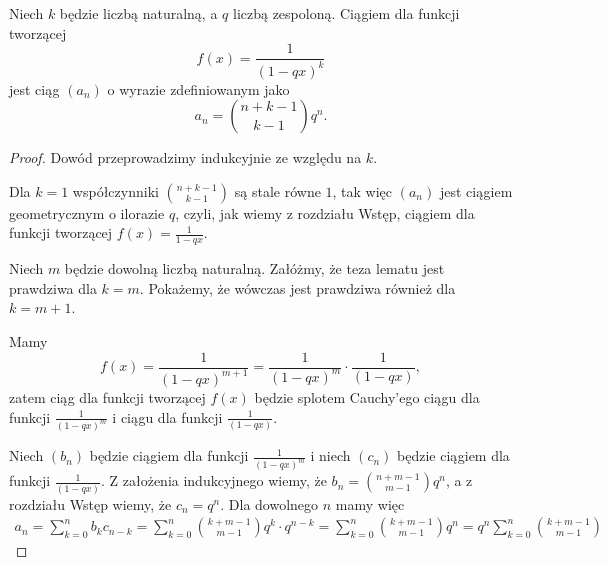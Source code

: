 \documentclass[shortabstract]{imthesis}
\begin{document}
    \begin{lemma}
    Niech $k$ będzie liczbą naturalną, a $q$ liczbą zespoloną. Ciągiem dla funkcji tworzącej
    $$
    f(x) = \frac{1}{(1-qx)^k}
    $$
    jest ciąg $(a_n)$ o wyrazie zdefiniowanym jako
    $$
    a_n = {n+k-1 \choose k-1} q^n.
    $$
    \end{lemma}
    \begin{proof}
    Dowód przeprowadzimy indukcyjnie ze względu na $k$.

    Dla $k = 1$ współczynniki ${n+k-1 \choose k-1}$ są stale równe $1$, tak więc $(a_n)$ jest ciągiem geometrycznym o ilorazie $q$, czyli, jak wiemy z rozdziału Wstęp, ciągiem dla funkcji tworzącej $f(x) = \frac{1}{1-qx}$. 

    Niech $m$ będzie dowolną liczbą naturalną. Załóżmy, że teza lematu jest prawdziwa dla $k=m$. Pokażemy, że wówczas jest prawdziwa również dla $k=m+1$.

    Mamy
    $$
    f(x) = \frac{1}{(1-qx)^{m+1}} = \frac{1}{(1-qx)^m} \cdot \frac{1}{(1-qx)},
    $$
    zatem ciąg dla funkcji tworzącej $f(x)$ będzie splotem Cauchy'ego ciągu dla funkcji $\frac{1}{(1-qx)^m}$ i ciągu dla funkcji $\frac{1}{(1-qx)}$.

    Niech $(b_n)$ będzie ciągiem dla funkcji $\frac{1}{(1-qx)^m}$ i niech $(c_n)$ będzie ciągiem dla funkcji $\frac{1}{(1-qx)}$. Z założenia indukcyjnego wiemy, że $b_n = {n+m-1 \choose m-1} q^n$, a z rozdziału Wstęp wiemy, że $c_n = q^n$. Dla dowolnego $n$ mamy więc
    \begin{align*}
        a_n = \sum_{k=0}^n b_kc_{n-k} = \sum_{k=0}^n {k+m-1 \choose m-1} q^k \cdot q^{n-k} = \sum_{k=0}^n {k+m-1 \choose m-1} q^n = q^n \sum_{k=0}^n {k+m-1 \choose m-1}
    \end{align*}


\end{proof}
\end{document}
